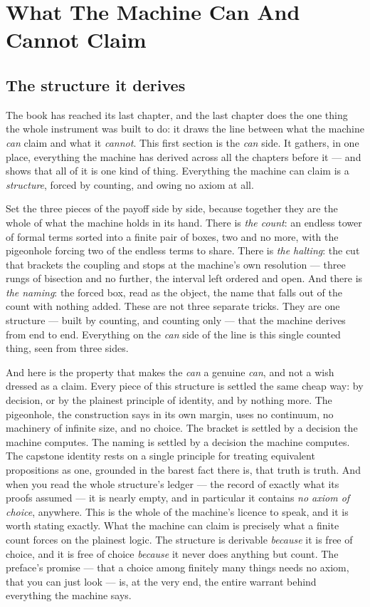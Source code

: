 \chapter{What The Machine Can And Cannot Claim}

\section{The structure it derives}

The book has reached its last chapter, and the last chapter does the one thing the whole instrument was built to do:
it draws the line between what the machine \emph{can} claim and what it \emph{cannot}. This first section is the
\emph{can} side. It gathers, in one place, everything the machine has derived across all the chapters before it ---
and shows that all of it is one kind of thing. Everything the machine can claim is a \emph{structure}, forced by
counting, and owing no axiom at all.

Set the three pieces of the payoff side by side, because together they are the whole of what the machine holds in its
hand. There is \emph{the count}: an endless tower of formal terms sorted into a finite pair of boxes, two and no more,
with the pigeonhole forcing two of the endless terms to share. There is \emph{the halting}: the cut that brackets the
coupling and stops at the machine's own resolution --- three rungs of bisection and no further, the interval left
ordered and open. And there is \emph{the naming}: the forced box, read as the object, the name that falls out of the
count with nothing added. These are not three separate tricks. They are one structure --- built by counting, and
counting only --- that the machine derives from end to end. Everything on the \emph{can} side of the line is this
single counted thing, seen from three sides.

And here is the property that makes the \emph{can} a genuine \emph{can}, and not a wish dressed as a claim. Every piece
of this structure is settled the same cheap way: by decision, or by the plainest principle of identity, and by nothing
more. The pigeonhole, the construction says in its own margin, uses no continuum, no machinery of infinite size, and no
choice. The bracket is settled by a decision the machine computes. The naming is settled by a decision the machine
computes. The capstone identity rests on a single principle for treating equivalent propositions as one, grounded in
the barest fact there is, that truth is truth. And when you read the whole structure's ledger --- the record of exactly
what its proofs assumed --- it is nearly empty, and in particular it contains \emph{no axiom of choice}, anywhere. This
is the whole of the machine's licence to speak, and it is worth stating exactly. What the machine can claim is
precisely what a finite count forces on the plainest logic. The structure is derivable \emph{because} it is free of
choice, and it is free of choice \emph{because} it never does anything but count. The preface's promise --- that a
choice among finitely many things needs no axiom, that you can just look --- is, at the very end, the entire warrant
behind everything the machine says.


